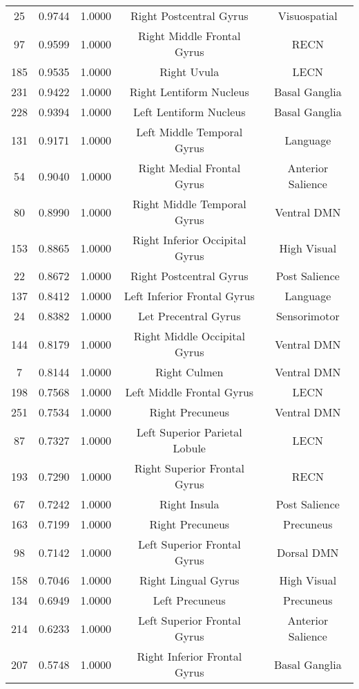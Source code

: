 \documentclass[10pt,letterpaper]{article}\usepackage[]{graphicx}\usepackage[]{color}
\begin{document}
\begin{center}
\begin{longtable}[c]{ccccc}
	25	& 0.9744 & 1.0000 & Right Postcentral Gyrus & Visuospatial \\
	97	& 0.9599 & 1.0000 & Right Middle Frontal Gyrus & RECN \\
	185	& 0.9535 & 1.0000 & Right Uvula & LECN \\
	231	& 0.9422 & 1.0000 & Right Lentiform Nucleus & Basal Ganglia \\
	228	& 0.9394 & 1.0000 & Left Lentiform Nucleus & Basal Ganglia \\
	131	& 0.9171 & 1.0000 & Left Middle Temporal Gyrus & Language \\
	54	& 0.9040 & 1.0000 & Right Medial Frontal Gyrus & Anterior Salience \\
	80	& 0.8990 & 1.0000 & Right Middle Temporal Gyrus & Ventral DMN \\
	153	& 0.8865 & 1.0000 & Right Inferior Occipital Gyrus & High Visual \\
	22	& 0.8672 & 1.0000 & Right Postcentral Gyrus & Post Salience \\
	137	& 0.8412 & 1.0000 & Left Inferior Frontal Gyrus & Language \\
	24	& 0.8382 & 1.0000 & Let Precentral Gyrus & Sensorimotor \\
	144	& 0.8179 & 1.0000 & Right Middle Occipital Gyrus & Ventral DMN \\
	7	& 0.8144 & 1.0000 & Right Culmen & Ventral DMN \\
	198	& 0.7568 & 1.0000 & Left Middle Frontal Gyrus & LECN \\
	251	& 0.7534 & 1.0000 & Right Precuneus & Ventral DMN \\
	87	& 0.7327 & 1.0000 & Left Superior Parietal Lobule & LECN \\
	193	& 0.7290 & 1.0000 & Right Superior Frontal Gyrus & RECN \\
	67	& 0.7242 & 1.0000 & Right Insula & Post Salience \\
	163	& 0.7199 & 1.0000 & Right Precuneus & Precuneus \\
	98	& 0.7142 & 1.0000 & Left Superior Frontal Gyrus & Dorsal DMN \\
	158	& 0.7046 & 1.0000 & Right Lingual Gyrus & High Visual \\
	134	& 0.6949 & 1.0000 & Left Precuneus & Precuneus \\
	214	& 0.6233 & 1.0000 & Left Superior Frontal Gyrus & Anterior Salience \\
	207	& 0.5748 & 1.0000 & Right Inferior Frontal Gyrus & Basal Ganglia \\

\end{longtable}
\end{center}
\end{document}
